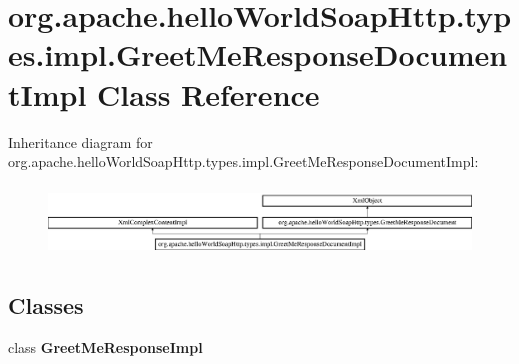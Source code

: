 \hypertarget{classorg_1_1apache_1_1hello_world_soap_http_1_1types_1_1impl_1_1_greet_me_response_document_impl}{}\section{org.\+apache.\+hello\+World\+Soap\+Http.\+types.\+impl.\+Greet\+Me\+Response\+Document\+Impl Class Reference}
\label{classorg_1_1apache_1_1hello_world_soap_http_1_1types_1_1impl_1_1_greet_me_response_document_impl}
Inheritance diagram for org.\+apache.\+hello\+World\+Soap\+Http.\+types.\+impl.\+Greet\+Me\+Response\+Document\+Impl\+:\begin{figure}[H]
\begin{center}
\leavevmode
\includegraphics[height=1.883408cm]{classorg_1_1apache_1_1hello_world_soap_http_1_1types_1_1impl_1_1_greet_me_response_document_impl}
\end{center}
\end{figure}
\subsection*{Classes}
\begin{DoxyCompactItemize}
\item 
class {\bfseries Greet\+Me\+Response\+Impl}
\end{DoxyCompactItemize}
